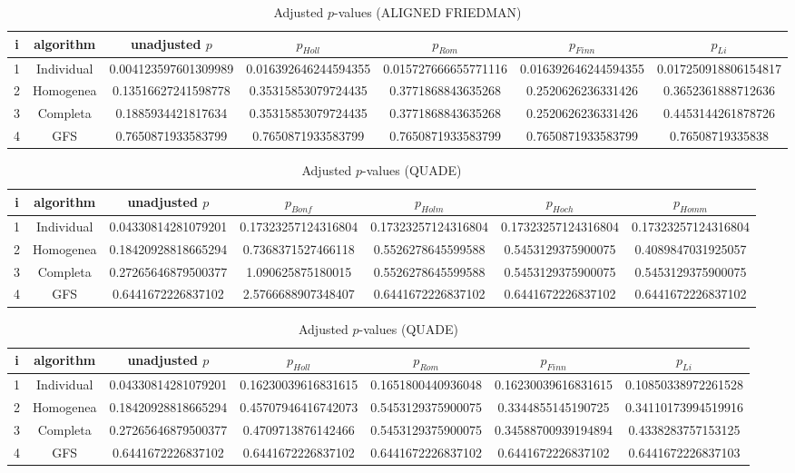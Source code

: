 \documentclass[a4paper,10pt]{article}
\begin{document}
\begin{landscape}
\begin{table}[!htp]
\centering\scriptsize
\caption{Adjusted $p$-values (ALIGNED FRIEDMAN)}
\begin{tabular}{ccccccc}
i&algorithm&unadjusted $p$&$p_{Holl}$&$p_{Rom}$&$p_{Finn}$&$p_{Li}$\\
\hline
1&Individual&0.004123597601309989&0.016392646244594355&0.015727666655771116&0.016392646244594355&0.017250918806154817\\
2&Homogenea&0.13516627241598778&0.35315853079724435&0.3771868843635268&0.2520626236331426&0.3652361888712636\\
3&Completa&0.1885934421817634&0.35315853079724435&0.3771868843635268&0.2520626236331426&0.4453144261878726\\
4&GFS&0.7650871933583799&0.7650871933583799&0.7650871933583799&0.7650871933583799&0.76508719335838\\
\hline
\end{tabular}
\end{table}


\newpage

\begin{table}[!htp]
\centering\scriptsize
\caption{Adjusted $p$-values (QUADE)}
\begin{tabular}{ccccccc}
i&algorithm&unadjusted $p$&$p_{Bonf}$&$p_{Holm}$&$p_{Hoch}$&$p_{Homm}$\\
\hline
1&Individual&0.04330814281079201&0.17323257124316804&0.17323257124316804&0.17323257124316804&0.17323257124316804\\
2&Homogenea&0.18420928818665294&0.7368371527466118&0.5526278645599588&0.5453129375900075&0.4089847031925057\\
3&Completa&0.27265646879500377&1.090625875180015&0.5526278645599588&0.5453129375900075&0.5453129375900075\\
4&GFS&0.6441672226837102&2.5766688907348407&0.6441672226837102&0.6441672226837102&0.6441672226837102\\
\hline
\end{tabular}
\end{table}

\begin{table}[!htp]
\centering\scriptsize
\caption{Adjusted $p$-values (QUADE)}
\begin{tabular}{ccccccc}
i&algorithm&unadjusted $p$&$p_{Holl}$&$p_{Rom}$&$p_{Finn}$&$p_{Li}$\\
\hline
1&Individual&0.04330814281079201&0.16230039616831615&0.1651800440936048&0.16230039616831615&0.10850338972261528\\
2&Homogenea&0.18420928818665294&0.45707946416742073&0.5453129375900075&0.3344855145190725&0.34110173994519916\\
3&Completa&0.27265646879500377&0.4709713876142466&0.5453129375900075&0.34588700939194894&0.4338283757153125\\
4&GFS&0.6441672226837102&0.6441672226837102&0.6441672226837102&0.6441672226837102&0.6441672226837103\\
\hline
\end{tabular}
\end{table}

\end{landscape}
\end{document}
